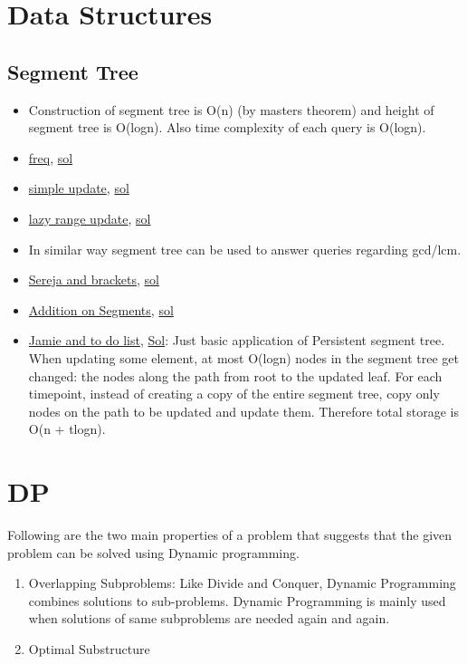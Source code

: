\documentclass[8pt, a4paper, oneside, twocolumn]{extarticle}
\begin{document}
\section{Data Structures}
\subsection{Segment Tree}
\begin{itemize}
    \item Construction of segment tree is O(n) (by masters theorem) and height of segment tree is O(logn). Also time complexity of each query is O(logn).
    \item \href{https://uva.onlinejudge.org/external/112/11235.pdf}{freq}, \href{https://gist.github.com/sourabh2311/adf33f80e4b1e95bdb7d7a0e28ae23e6}{sol}
    \item \href{https://uva.onlinejudge.org/external/112/11297.pdf}{simple update}, \href{https://gist.github.com/sourabh2311/1376c934be55a72ca3f7c6f7481125ca}{sol}
    \item \href{https://uva.onlinejudge.org/external/114/11402.pdf}{lazy range update}, \href{https://github.com/sourabh2311/Competitive-Programming/blob/master/UVA_11402.cpp}{sol}
    \item In similar way segment tree can be used to answer queries regarding gcd/lcm.
    \item \href{https://codeforces.com/problemset/problem/380/C}{Sereja and brackets}, \href{https://github.com/sourabh2311/Competitive-Programming/blob/master/CF/Data%20Structures/Segment%20Tree/380C%20-%20Seraja%20And%20Brackets.cpp}{sol}
    \item \href{https://codeforces.com/problemset/problem/981/E}{Addition on Segments}, \href{https://github.com/sourabh2311/Competitive-Programming/blob/master/CF/Data%20Structures/Segment%20Tree/Problem%20-%20E%20Addition%20On%20Segments_sol_tourist.cpp}{sol}
    \item \href {https://codeforces.com/contest/916/problem/D}{Jamie and to do list}, \href {https://github.com/sourabh2311/Competitive-Programming/blob/master/CF/457D2/D.cpp}{Sol}: Just basic application of Persistent segment tree. When updating some element, at most O(logn) nodes in the segment tree get changed: the nodes along the path from root to the updated leaf. For each timepoint, instead of creating a copy of the entire segment tree, copy only nodes on the path to be updated and update them. Therefore total storage is O(n + t\*logn).
\end{itemize}
\section{DP}
Following are the two main properties of a problem that suggests that the given problem can be solved using Dynamic programming.
\begin{enumerate}
    \item Overlapping Subproblems: Like Divide and Conquer, Dynamic Programming combines solutions to sub-problems. Dynamic Programming is mainly used when solutions of same subproblems are needed again and again.
    \item Optimal Substructure
\end{enumerate}
\end{document}
